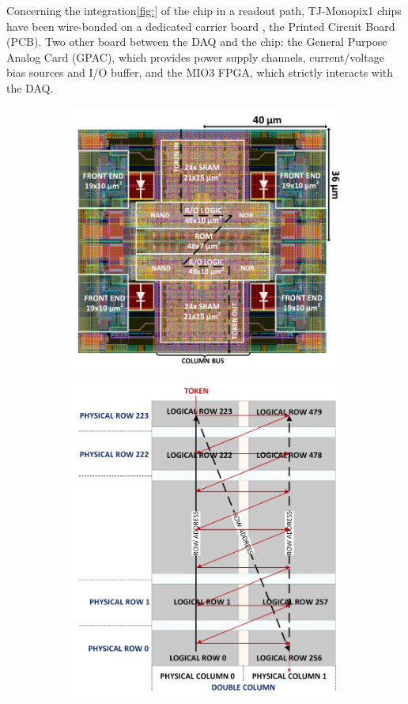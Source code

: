 Concerning the integration\ref{fig:} of the chip in a readout path, TJ-Monopix1 chips have been wire-bonded on a dedicated carrier board , the Printed Circuit Board (PCB). Two other board between the DAQ and the chip: the General Purpose Analog Card (GPAC), which provides power supply channels, current/voltage bias sources and I/O buffer, and the MIO3 FPGA, which strictly interacts with the DAQ.
\begin{figure}[h!]
    \begin{subfigure}{.5\textwidth}
    \centering
    \includegraphics[width=.98\linewidth]{figures/Monopix1/Monopix1_2x2pixelsgroup.png}
    \caption{}
    \label{fig:pixels_core}
    \end{subfigure}
    \begin{subfigure}{.5\textwidth}
    \centering
    \includegraphics[width=.88\linewidth]{figures/Monopix1/column_order.png}

\end{subfigure}
\end{figure}
